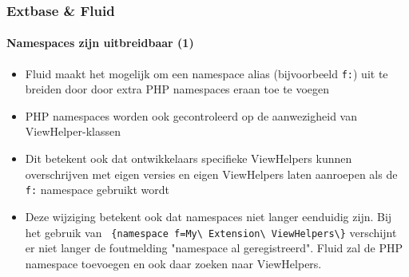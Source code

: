 
\begin{frame}[fragile]
	\frametitle{Extbase \& Fluid}
	\framesubtitle{Namespaces zijn uitbreidbaar (1)}

	\begin{itemize}

		\item Fluid maakt het mogelijk om een namespace alias (bijvoorbeeld \texttt{f:}) uit te
			breiden door door extra PHP namespaces eraan toe te voegen

		\item PHP namespaces worden ook gecontroleerd op de aanwezigheid van ViewHelper-klassen

		\item Dit betekent ook dat ontwikkelaars specifieke ViewHelpers kunnen overschrijven
			met eigen versies en eigen ViewHelpers laten aanroepen als de \texttt{f:} namespace
			gebruikt wordt

		\item Deze wijziging betekent ook dat namespaces niet langer eenduidig zijn.\newline
			Bij het gebruik van \texttt{
				\{namespace f=My\textbackslash
				Extension\textbackslash
				ViewHelpers\textbackslash\}}
				verschijnt er niet langer de foutmelding "namespace al geregistreerd".
				Fluid zal de PHP namespace toevoegen en ook daar zoeken naar ViewHelpers.

	\end{itemize}

\end{frame}


